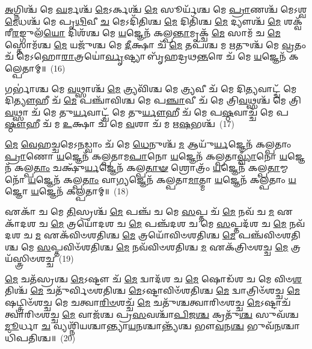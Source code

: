 {\anuvakamend[{\-\ul{𑌗𑍃}\-𑌹𑌾\-\ul{𑌶𑍍𑌚} 𑌷𑍋𑌡᳴𑌶 𑌚}]}%

\-\ul{𑌅}\-𑌗𑍍𑌨𑌿𑌶𑍍𑌚᳴ 𑌮𑍇 \ul{𑌘}\-𑌰𑍍𑌮𑌶𑍍𑌚᳴ \ul{𑌮𑍇}\-\-𑌽𑌰𑍍𑌕𑌶𑍍𑌚᳴ \ul{𑌮𑍇} 𑌸𑍂𑌰𑍍𑌯᳴𑌶𑍍𑌚 𑌮𑍇 \ul{𑌪𑍍𑌰𑌾}\-𑌣𑌶𑍍𑌚᳴ 𑌮𑍇\-𑌽𑌶𑍍𑌵\-\ul{𑌮𑍇}\-𑌧𑌶𑍍𑌚᳴ 𑌮𑍇 𑌪𑍃\-\ul{𑌥𑌿}\-𑌵𑍀 \ul{𑌚} 𑌮𑍇\-𑌽𑌦𑌿᳴𑌤𑌿𑌶𑍍𑌚 \ul{𑌮𑍇} 𑌦𑌿𑌤𑌿᳴𑌶𑍍𑌚 \ul{𑌮𑍇} 𑌦𑍍𑌯𑍗𑌶𑍍𑌚᳴ \ul{𑌮𑍇} 𑌶𑌕𑍍𑌵᳴𑌰𑍀\-\ul{𑌰}\-𑌙𑍍𑌗𑍁𑌲᳴\-\ul{𑌯𑍋} 𑌦𑌿𑌶᳴𑌶𑍍𑌚 𑌮𑍇 \ul{𑌯}\-𑌜𑍍𑌞𑍇𑌨᳴ 𑌕𑌲𑍍𑌪\-\ul{𑌨𑍍𑌤𑌾}\-𑌮𑍃𑌕𑍍𑌚᳴ \ul{𑌮𑍇} 𑌸𑌾𑌮᳴ 𑌚 \ul{𑌮𑍇} 𑌸𑍍𑌤𑍋𑌮᳴𑌶𑍍𑌚 \ul{𑌮𑍇} 𑌯𑌜𑍁᳴𑌶𑍍𑌚 𑌮𑍇 \ul{𑌦𑍀}\-𑌕𑍍𑌷𑌾 𑌚᳴ \ul{𑌮𑍇} 𑌤𑌪᳴𑌶𑍍𑌚 𑌮 \ul{𑌋}\-𑌤𑍁𑌶𑍍𑌚᳴ 𑌮𑍇 \ul{𑌵𑍍𑌰}\-𑌤𑌂 𑌚᳴ 𑌮𑍇\-𑌽𑌹𑍋\-\ul{𑌰𑌾}\-𑌤𑍍𑌰𑌯𑍋॑\-\ul{𑌰𑍍𑌵𑍃}\-𑌷𑍍𑌟𑍍𑌯𑌾 𑌬𑍃᳴𑌹𑌦𑍍𑌰𑌥\-\ul{𑌨𑍍𑌤}\-𑌰𑍇 𑌚᳴ 𑌮𑍇 \ul{𑌯}\-𑌜𑍍𑌞𑍇𑌨᳴ 𑌕𑌲𑍍𑌪𑍇𑌤𑌾𑌮𑍍॥~(16)

{\anuvakamend[{\-\ul{𑌦𑍀}\-𑌕𑍍𑌷𑌾\-𑌽𑌷𑍍𑌟𑌾𑌦᳴𑌶 𑌚}]}%

𑌗𑌰𑍍𑌭𑌾॑𑌶𑍍𑌚 𑌮𑍇 \ul{𑌵}\-𑌥𑍍𑌸𑌾𑌶𑍍𑌚᳴ \ul{𑌮𑍇} 𑌤𑍍𑌰𑍍𑌯𑌵𑌿᳴𑌶𑍍𑌚 𑌮𑍇 \ul{𑌤𑍍𑌰𑍍𑌯}\-𑌵𑍀 𑌚᳴ 𑌮𑍇 𑌦𑌿\-\ul{𑌤𑍍𑌯}\-𑌵𑌾𑌟𑍍𑌚᳴ 𑌮𑍇 𑌦𑌿\-\ul{𑌤𑍍𑌯𑍗}\-𑌹𑍀 𑌚᳴ \ul{𑌮𑍇} 𑌪𑌞𑍍𑌚𑌾᳴𑌵𑌿𑌶𑍍𑌚 𑌮𑍇 𑌪\-\ul{𑌞𑍍𑌚𑌾}\-𑌵𑍀 𑌚᳴ 𑌮𑍇 𑌤𑍍𑌰𑌿\-\ul{𑌵}\-𑌥𑍍𑌸𑌶𑍍𑌚᳴ 𑌮𑍇 𑌤𑍍𑌰𑌿\-\ul{𑌵}\-𑌥𑍍𑌸𑌾 𑌚᳴ 𑌮𑍇 𑌤𑍁\-\ul{𑌰𑍍𑌯}\-𑌵𑌾𑌟𑍍𑌚᳴ 𑌮𑍇 𑌤𑍁\-\ul{𑌰𑍍𑌯𑍗}\-𑌹𑍀 𑌚᳴ 𑌮𑍇 𑌪\-\ul{𑌷𑍍𑌠}\-𑌵𑌾𑌚𑍍𑌚᳴ 𑌮𑍇 𑌪\-\ul{𑌷𑍍𑌠𑍗}\-𑌹𑍀 𑌚᳴ 𑌮 \ul{𑌉}\-𑌕𑍍𑌷𑌾 𑌚᳴ 𑌮𑍇 \ul{𑌵}\-𑌶𑌾 𑌚᳴ 𑌮 𑌋\-\ul{𑌷}\-𑌭𑌶𑍍𑌚᳴~(17)

\-\ul{𑌮𑍇} \ul{𑌵𑍇}\-𑌹𑌚𑍍𑌚𑌮𑍇\-𑌽\-\ul{𑌨}\-𑌡𑍍𑌵𑌾𑌂 𑌚᳴ 𑌮𑍇 \ul{𑌧𑍇}\-𑌨𑍁𑌶𑍍𑌚᳴ \ul{𑌮} 𑌆𑌯𑍁᳴\-\ul{𑌰𑍍𑌯}\-𑌜𑍍𑌞𑍇𑌨᳴ 𑌕𑌲𑍍𑌪𑌤𑌾𑌂 \ul{𑌪𑍍𑌰𑌾}\-𑌣𑍋 \ul{𑌯}\-𑌜𑍍𑌞𑍇𑌨᳴ 𑌕𑌲𑍍𑌪𑌤𑌾𑌮\-\ul{𑌪𑌾}\-𑌨𑍋 \ul{𑌯}\-𑌜𑍍𑌞𑍇𑌨᳴ 𑌕𑌲𑍍𑌪𑌤𑌾\-\ul{𑌵𑍍𑌵𑍍𑌯𑌾𑌁}\-𑌨𑍋 \ul{𑌯}\-𑌜𑍍𑌞𑍇𑌨᳴ 𑌕𑌲𑍍𑌪\-\ul{𑌤𑌾𑌂} 𑌚𑌕𑍍𑌷𑍁᳴\-\ul{𑌰𑍍𑌯}\-𑌜𑍍𑌞𑍇𑌨᳴ 𑌕𑌲𑍍𑌪\-\ul{𑌤𑌾}\-\-\ul{𑍟} 𑌶𑍍𑌰𑍋𑌤𑍍𑌰𑌂᳴ \ul{𑌯}\-𑌜𑍍𑌞𑍇𑌨᳴ 𑌕𑌲𑍍𑌪\-\ul{𑌤𑌾}\-𑌮𑍍𑌮𑌨𑍋᳴ \ul{𑌯}\-𑌜𑍍𑌞𑍇𑌨᳴ 𑌕𑌲𑍍𑌪\-\ul{𑌤𑌾𑌂} 𑌵𑌾\-\ul{𑌗𑍍𑌯}\-𑌜𑍍𑌞𑍇𑌨᳴ 𑌕𑌲𑍍𑌪𑌤𑌾\-\ul{𑌮𑌾}\-𑌤𑍍𑌮𑌾 \ul{𑌯}\-𑌜𑍍𑌞𑍇𑌨᳴ 𑌕𑌲𑍍𑌪𑌤𑌾𑌂 \ul{𑌯}\-𑌜𑍍𑌞𑍋 \ul{𑌯}\-𑌜𑍍𑌞𑍇𑌨᳴ 𑌕𑌲𑍍𑌪𑌤𑌾𑌮𑍍॥~(18)

{\anuvakamend[{\-\ul{𑌋}\-\-\ul{𑌷}\-𑌭𑌶𑍍𑌚᳴ 𑌚𑌤𑍍𑌵𑌾\-\ul{𑌰𑌿}\-\-\ul{𑍞}\-𑌶𑌚𑍍𑌚᳴}]}%

𑌏𑌕𑌾᳴ 𑌚 𑌮𑍇 \ul{𑌤𑌿}\-𑌸𑍍𑌰𑌶𑍍𑌚᳴ \ul{𑌮𑍇} 𑌪𑌞𑍍𑌚᳴ 𑌚 𑌮𑍇 \ul{𑌸}\-𑌪𑍍𑌤 𑌚᳴ \ul{𑌮𑍇} 𑌨𑌵᳴ 𑌚 \ul{𑌮} 𑌏𑌕𑌾᳴\-𑌦𑌶 𑌚 \ul{𑌮𑍇} 𑌤𑍍𑌰𑌯𑍋᳴𑌦𑌶 𑌚 \ul{𑌮𑍇} 𑌪𑌞𑍍𑌚᳴𑌦𑌶 𑌚 𑌮𑍇 \ul{𑌸}\-𑌪𑍍𑌤𑌦᳴𑌶 𑌚 \ul{𑌮𑍇} 𑌨𑌵᳴𑌦𑌶 𑌚 \ul{𑌮} 𑌏𑌕᳴𑌵𑌿𑍞𑌶𑌤𑌿𑌶𑍍𑌚 \ul{𑌮𑍇} 𑌤𑍍𑌰𑌯𑍋᳴𑌵𑌿𑍞𑌶𑌤𑌿𑌶𑍍𑌚 \ul{𑌮𑍇} 𑌪𑌞𑍍𑌚᳴𑌵𑌿𑍞𑌶𑌤𑌿𑌶𑍍𑌚 𑌮𑍇 \ul{𑌸}\-𑌪𑍍𑌤𑌵𑌿𑍞᳴𑌶𑌤𑌿𑌶𑍍𑌚 \ul{𑌮𑍇} 𑌨𑌵᳴𑌵𑌿𑍞𑌶𑌤𑌿𑌶𑍍𑌚 \ul{𑌮} 𑌏𑌕᳴𑌤𑍍𑌰𑌿𑍞𑌶𑌚𑍍𑌚 \ul{𑌮𑍇} 𑌤𑍍𑌰𑌯᳴𑌸𑍍𑌤𑍍𑌰𑌿𑍞𑌶𑌚𑍍𑌚~(19)

\-\ul{𑌮𑍇} 𑌚𑌤᳴𑌸𑍍𑌰𑌶𑍍𑌚 \ul{𑌮𑍇}\-\-𑌽𑌷𑍍𑌟𑍗 𑌚᳴ \ul{𑌮𑍇} 𑌦𑍍𑌵𑌾𑌦᳴𑌶 𑌚 \ul{𑌮𑍇} 𑌷𑍋𑌡᳴𑌶 𑌚 𑌮𑍇 𑌵𑌿𑍞\-\ul{𑌶}\-𑌤𑌿𑌶𑍍𑌚᳴ \ul{𑌮𑍇} 𑌚𑌤𑍁᳴𑌰𑍍𑌵𑌿𑍞𑌶𑌤𑌿𑌶𑍍𑌚 \ul{𑌮𑍇}\-\-𑌽𑌷𑍍𑌟𑌾𑌵𑌿𑍞᳴𑌶𑌤𑌿𑌶𑍍𑌚 \ul{𑌮𑍇} 𑌦𑍍𑌵𑌾𑌤𑍍𑌰𑌿𑍞᳴𑌶𑌚𑍍𑌚 \ul{𑌮𑍇} 𑌷𑌟𑍍𑌤𑍍𑌰𑌿𑍞᳴𑌶𑌚𑍍𑌚 𑌮𑍇 𑌚𑌤𑍍𑌵𑌾\-\ul{𑌰𑌿}\-\-\ul{𑍞}\-𑌶𑌚𑍍𑌚᳴ \ul{𑌮𑍇} 𑌚𑌤𑍁᳴𑌶𑍍𑌚𑌤𑍍𑌵𑌾𑌰𑌿𑍞𑌶𑌚𑍍𑌚 \ul{𑌮𑍇}\-\-𑌽𑌷𑍍𑌟𑌾𑌚᳴𑌤𑍍𑌵𑌾𑌰𑌿𑍞𑌶𑌚𑍍𑌚 \ul{𑌮𑍇} 𑌵𑌾𑌜᳴𑌶𑍍𑌚 𑌪𑍍𑌰\-\ul{𑌸}\-𑌵𑌶𑍍𑌚𑌾᳴\-\ul{𑌪𑌿}\-𑌜\-\ul{𑌶𑍍𑌚} 𑌕𑍍𑌰𑌤𑍁᳴\-\ul{𑌶𑍍𑌚} 𑌸𑍁𑌵᳴𑌶𑍍𑌚 \ul{𑌮𑍂}\-𑌰𑍍𑌧𑌾 \ul{𑌚} 𑌵𑍍𑌯𑌶𑍍𑌨𑌿᳴𑌯𑌶𑍍𑌚𑌾𑌨𑍍𑌤𑍍𑌯𑌾\-\ul{𑌯}\-𑌨𑌶𑍍𑌚𑌾𑌨𑍍𑌤𑍍𑌯᳴𑌶𑍍𑌚 𑌭𑍗\-\ul{𑌵}\-𑌨\-\ul{𑌶𑍍𑌚} 𑌭𑍁𑌵᳴\-\ul{𑌨}\-𑌶𑍍𑌚𑌾𑌧𑌿᳴𑌪𑌤𑌿𑌶𑍍𑌚॥~(20)

